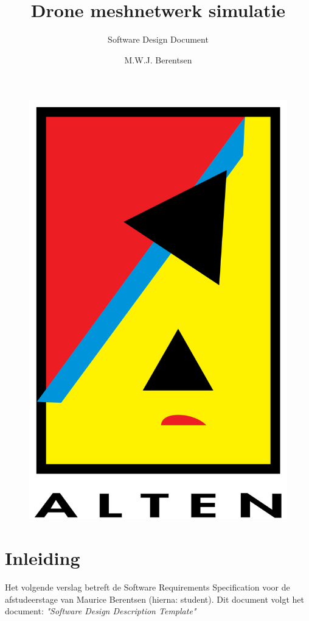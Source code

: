 \documentclass[a4paper, 11pt, oneside]{report}
\author{M.W.J. Berentsen}
\title{\myfont Drone meshnetwerk simulatie}
\subtitle{Software Design Document}{Versie 1.0}{Alten Nederland B.V.}{Hogeschool van Arnhem en Nijmegen}{HBO Technische Informatica - Embedded Software Developement }{MWJ.Berentsen@student.han.nl}{Studentnummer: 561399}{Docent: J. Visch, MSc}{Assessor: ir. C.G.R. van Uffelen}
\begin{document}
\begin{figure}
	\begin{center}\includegraphics[scale=0.1]{Afbeeldingen/alten.png}\end{center}
\end{figure}
\maketitle

\tableofcontents
\clearpage




\chapter{Inleiding}
\label{inleiding}
Het volgende verslag betreft de Software Requirements Specification voor de afstudeerstage van Maurice Berentsen (hierna: student).
Dit document volgt het document: \textit{"Software Design Description Template"} \cite{template:sdd}
\end{document}

